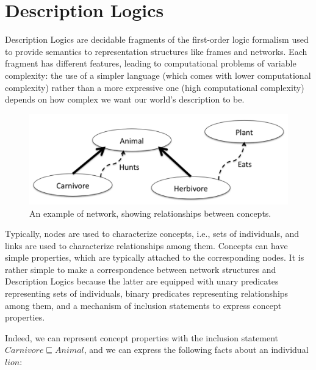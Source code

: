 \documentclass[a4paper, 11pt, oneside]{duthesis}
\begin{document}
\newpage



\chapter{Description Logics}\label{dl}

Description Logics are decidable fragments of the first-order logic formalism used to provide semantics to representation structures like frames and networks.
Each fragment has different features, leading to computational problems of variable complexity: the use of a simpler language (which comes with lower computational complexity) rather than a more expressive one (high computational complexity) depends on how complex we want our world's description to be.


\begin{figure}[htp]
\centering
\includegraphics[scale=.33]{img/relationship_network.png}
\caption{An example of network, showing relationships between concepts.}
\label{rel_net}
\end{figure}

Typically, nodes are used to characterize concepts, i.e., sets of individuals, and links are used to characterize relationships among them.
Concepts can have simple properties, which are typically attached to the corresponding nodes.
It is rather simple to make a correspondence between network structures and Description Logics because the latter are equipped with unary predicates representing sets of individuals, binary predicates representing relationships among them, and a mechanism of inclusion statements to express concept properties.

\newpage

Indeed, we can represent concept properties with the inclusion statement $Carnivore \sqsubseteq Animal$, and we can express the following facts about an individual $lion$: 
\end{document}
